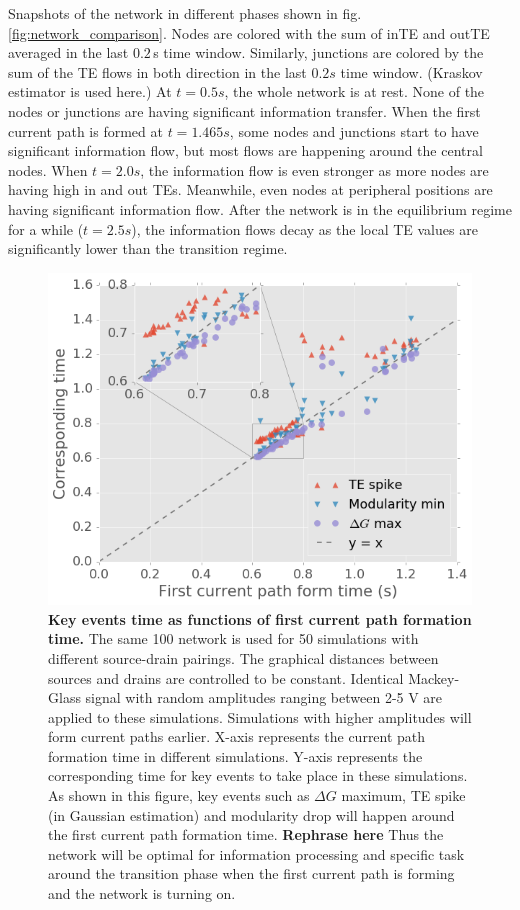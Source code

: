 \documentclass[fleqn,10pt,  amsmath,amssymb,aps]{wlscirep}
\begin{document}
Snapshots of the network in different phases shown in fig. \ref{fig:network_comparison}. Nodes are colored with the sum of inTE and outTE averaged in the last $0.2\,$s time window. Similarly, junctions are colored by the sum of the TE flows in both direction in the last $0.2 s$ time window. (Kraskov estimator is used here.) At $t= 0.5 s$, the whole network is at rest. None of the nodes or junctions are having significant information transfer. When the first current path is formed at $t = 1.465 s$, some nodes and junctions start to have significant information flow, but most flows are happening around the central nodes. When $t = 2.0 s$, the information flow is even stronger as more nodes are having high in and out TEs. Meanwhile, even nodes at peripheral positions are having significant information flow. After the network is in the equilibrium regime for a while ($t = 2.5 s$), the information flows decay as the local TE values are significantly lower than the transition regime.

\begin{figure}[]
	\centering
	\includegraphics[width=0.5\linewidth]{figure/time_align}
	\caption{\textbf{Key events time as functions of first current path formation time.} 
			The same 100 network is used for 50 simulations with different source-drain pairings. The graphical distances between sources and drains are controlled to be constant. Identical Mackey-Glass signal with random amplitudes ranging between 2-5 V are applied to these simulations. Simulations with higher amplitudes will form current paths earlier. 
			\newline 
			X-axis represents the current path formation time in different simulations. Y-axis represents the corresponding time for key events to take place in these simulations. As shown in this figure, key events such as $\Delta G$ maximum, TE spike (in Gaussian estimation) and modularity drop will happen around the first current path formation time. 
			\newline
			\textbf{Rephrase here} Thus the network will be optimal for information processing and specific task around the transition phase when the first current path is forming and the network is turning on. }
	\label{fig:time_align}
\end{figure}
\end{document}

